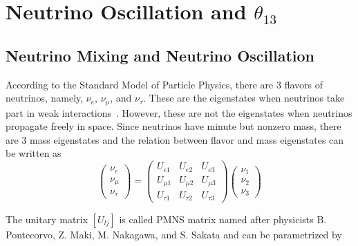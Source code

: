 \section{Neutrino Oscillation and \texorpdfstring{$\theta_{13}$}{theta13}}\label{sec:oscillation_theory}

\subsection{Neutrino Mixing and Neutrino Oscillation}
According to the Standard Model of Particle Physics, there are 3 flavors of neutrinos, namely, $\nu_e$, $\nu_\mu$, and $\nu_\tau$. These are the eigenstates when neutrinos take part in weak interactions~\cite{Olive2014}. However, these are not the eigenstates when neutrinos propagate freely in space. Since neutrinos have minute but nonzero mass, there are 3 mass eigenstates and the relation between flavor and mass eigenstates can be written as
\begin{equation}
\left( \begin{array}{c} \nu_e \\ \nu_\mu \\ \nu_\tau \end{array} \right)
=
\begin{pmatrix}
U_{e1} & U_{e2} & U_{e3} \\
U_{\mu1} & U_{\mu2} & U_{\mu3} \\
U_{\tau1} & U_{\tau2} & U_{\tau3}
\end{pmatrix}
\left( \begin{array}{c} \nu_1 \\ \nu_2 \\ \nu_3 \end{array} \right)
\end{equation}

The unitary matrix $[U_{lj}]$ is called PMNS matrix named after physicists B. Pontecorvo, Z. Maki, M. Nakagawa, and S. Sakata and can be parametrized by~\cite{Valle2006}

